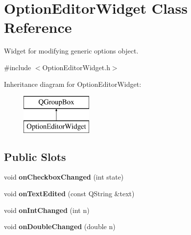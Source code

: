 \hypertarget{class_option_editor_widget}{}\section{Option\+Editor\+Widget Class Reference}
\label{class_option_editor_widget}


Widget for modifying generic options object.  




{\ttfamily \#include $<$Option\+Editor\+Widget.\+h$>$}

Inheritance diagram for Option\+Editor\+Widget\+:\begin{figure}[H]
\begin{center}
\leavevmode
\includegraphics[height=2.000000cm]{class_option_editor_widget}
\end{center}
\end{figure}
\subsection*{Public Slots}
\begin{DoxyCompactItemize}
\item 
void {\bfseries on\+Checkbox\+Changed} (int state)\hypertarget{class_option_editor_widget_af091fec5c4f6c40173be3656fd041c12}{}\label{class_option_editor_widget_af091fec5c4f6c40173be3656fd041c12}

\item 
void {\bfseries on\+Text\+Edited} (const Q\+String \&text)\hypertarget{class_option_editor_widget_ac7b1308fcee65a92a47c7776582dc5f6}{}\label{class_option_editor_widget_ac7b1308fcee65a92a47c7776582dc5f6}

\item 
void {\bfseries on\+Int\+Changed} (int n)\hypertarget{class_option_editor_widget_a6c52fc4d311d806b5a66fc398db21eba}{}\label{class_option_editor_widget_a6c52fc4d311d806b5a66fc398db21eba}

\item 
void {\bfseries on\+Double\+Changed} (double n)\hypertarget{class_option_editor_widget_a00985b7680ba7d8f01ab555e7301093e}{}\label{class_option_editor_widget_a00985b7680ba7d8f01ab555e7301093e}

\end{DoxyCompactItemize}
